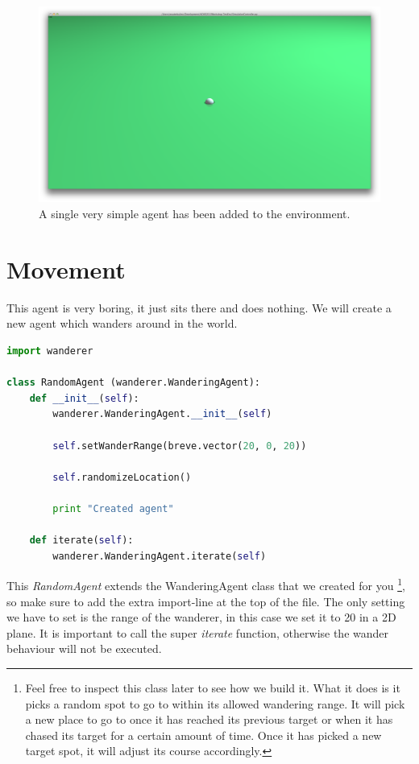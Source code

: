 

\begin{figure}[htbp]
\begin{center}
\includegraphics{graphics/simpleagent}
\caption{A single very simple agent has been added to the environment.}
\end{center}
\end{figure}

\section{Movement}
This agent is very boring, it just sits there and does nothing. We will create a new agent which wanders around in the world.

\begin{fullwidth}
\begin{lstlisting}[language=Python]
import wanderer

class RandomAgent (wanderer.WanderingAgent):
	def __init__(self):
		wanderer.WanderingAgent.__init__(self)

		self.setWanderRange(breve.vector(20, 0, 20))
		
		self.randomizeLocation()
		
		print "Created agent"

	def iterate(self):
		wanderer.WanderingAgent.iterate(self)
\end{lstlisting}
\end{fullwidth}


This \textit{RandomAgent} extends the WanderingAgent class that we created for you \footnote{Feel free to inspect this class later to see how we build it. What it does is it picks a random spot to go to within its allowed wandering range. It will pick a new place to go to once it has reached its previous target or when it has chased its target for a certain amount of time. Once it has picked a new target spot, it will adjust its course accordingly.}, so make sure to add the extra import-line at the top of the file. The only setting we have to set is the range of the wanderer, in this case we set it to 20 in a 2D plane. It is important to call the super \textit{iterate} function, otherwise the wander behaviour will not be executed.

